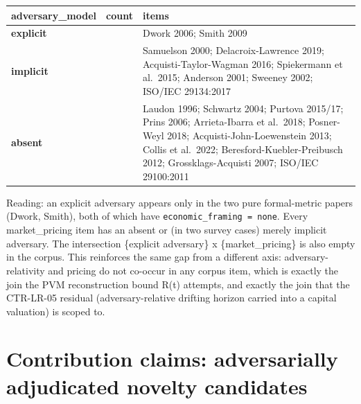 \documentclass[
  11pt,
]{article}
\newcounter{none} %
\begin{document}
{\def\LTcaptype{none} %
\begin{longtable}[]{@{}
  >{\raggedright\arraybackslash}p{}
  >{\raggedright\arraybackslash}p{}
  >{\raggedright\arraybackslash}p{}@{}}
\toprule\noalign{}
\begin{minipage}[b]{\linewidth}\raggedright
adversary\_model
\end{minipage} & \begin{minipage}[b]{\linewidth}\raggedright
count
\end{minipage} & \begin{minipage}[b]{\linewidth}\raggedright
items
\end{minipage} \\
\midrule\noalign{}
\endhead
\bottomrule\noalign{}
\endlastfoot
\textbf{explicit} & 2 & Dwork 2006; Smith 2009 \\
\textbf{implicit} & 7 & Samuelson 2000; Delacroix-Lawrence 2019;
Acquisti-Taylor-Wagman 2016; Spiekermann et al.~2015; Anderson 2001;
Sweeney 2002; ISO/IEC 29134:2017 \\
\textbf{absent} & 11 & Laudon 1996; Schwartz 2004; Purtova 2015/17;
Prins 2006; Arrieta-Ibarra et al.~2018; Posner-Weyl 2018;
Acquisti-John-Loewenstein 2013; Collis et al.~2022;
Beresford-Kuebler-Preibusch 2012; Grossklags-Acquisti 2007; ISO/IEC
29100:2011 \\
\end{longtable}
}

Reading: an explicit adversary appears only in the two pure
formal-metric papers (Dwork, Smith), both of which have
\texttt{economic\_framing\ =\ none}. Every market\_pricing item has an
absent or (in two survey cases) merely implicit adversary. The
intersection \{explicit adversary\} x \{market\_pricing\} is also empty
in the corpus. This reinforces the same gap from a different axis:
adversary-relativity and pricing do not co-occur in any corpus item,
which is exactly the join the PVM reconstruction bound R(t) attempts,
and exactly the join that the CTR-LR-05 residual (adversary-relative
drifting horizon carried into a capital valuation) is scoped to.

\newpage

\section{Contribution claims: adversarially adjudicated novelty
candidates}\label{contribution-claims-adversarially-adjudicated-novelty-candidates}
\end{document}
